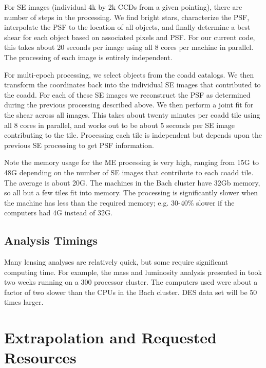\documentclass[12pt]{article}
\begin{document}
For SE images (individual 4k by 2k CCDs from a given pointing), there are
number of steps in the processing. We find bright stars, characterize the PSF,
interpolate the PSF to the location of all objects, and finally determine a
best shear for each object based on associated pixels and PSF.  For our current
code, this takes about 20 seconds per image using all 8 cores per machine in
parallel.  The processing of each image is entirely independent.

For multi-epoch processing, we select objects from the coadd catalogs.  We then
transform the coordinates back into the individual SE images that contributed
to the coadd.  For each of these SE images we reconstruct the PSF as determined
during the previous processing described above. We then perform a joint fit for
the shear across all images.  This takes about twenty minutes per coadd tile
using all 8 cores in parallel, and works out to be about 5 seconds per SE image
contributing to the tile.  Processing each tile is independent but depends upon
the previous SE processing to get PSF information.

Note the memory usage for the ME processing is very high, ranging from 15G to
48G depending on the number of SE images that contribute to each coadd tile.
The average is about 20G.  The machines in the Bach cluster have 32Gb memory,
so all but a few tiles fit into memory.  The processing is significantly slower
when the machine has less than the required memory; e.g. 30-40\% slower if the
computers had 4G instead of 32G. 

\subsection{Analysis Timings}

Many lensing analyses are relatively quick, but some require significant
computing time.  For example, the mass and luminosity analysis presented in
\cite{SheldonM2L07} took two weeks running on a 300 processor cluster.  The
computers used were about a factor of two slower than the CPUs in the Bach
cluster.  DES data set will be 50 times larger.

\section{Extrapolation and Requested Resources}
\end{document}
